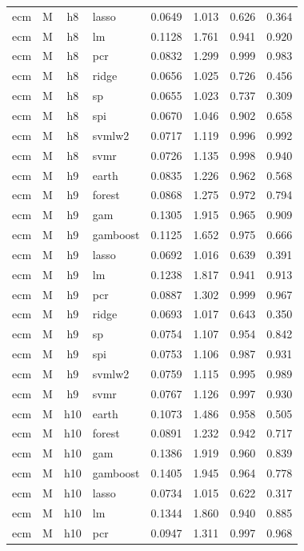 \begin{ThreePartTable}
\begin{longtable}[t]{llclcccc}
ecm & M & h8 & lasso & 0.0649 & 1.013 & 0.626 & 0.364\\
ecm & M & h8 & lm & 0.1128 & 1.761 & 0.941 & 0.920\\
ecm & M & h8 & pcr & 0.0832 & 1.299 & 0.999 & 0.983\\
ecm & M & h8 & ridge & 0.0656 & 1.025 & 0.726 & 0.456\\
ecm & M & h8 & sp & 0.0655 & 1.023 & 0.737 & 0.309\\
ecm & M & h8 & spi & 0.0670 & 1.046 & 0.902 & 0.658\\
ecm & M & h8 & svmlw2 & 0.0717 & 1.119 & 0.996 & 0.992\\
ecm & M & h8 & svmr & 0.0726 & 1.135 & 0.998 & 0.940\\
\addlinespace
ecm & M & h9 & earth & 0.0835 & 1.226 & 0.962 & 0.568\\
ecm & M & h9 & forest & 0.0868 & 1.275 & 0.972 & 0.794\\
ecm & M & h9 & gam & 0.1305 & 1.915 & 0.965 & 0.909\\
ecm & M & h9 & gamboost & 0.1125 & 1.652 & 0.975 & 0.666\\
ecm & M & h9 & lasso & 0.0692 & 1.016 & 0.639 & 0.391\\
ecm & M & h9 & lm & 0.1238 & 1.817 & 0.941 & 0.913\\
ecm & M & h9 & pcr & 0.0887 & 1.302 & 0.999 & 0.967\\
ecm & M & h9 & ridge & 0.0693 & 1.017 & 0.643 & 0.350\\
ecm & M & h9 & sp & 0.0754 & 1.107 & 0.954 & 0.842\\
ecm & M & h9 & spi & 0.0753 & 1.106 & 0.987 & 0.931\\
ecm & M & h9 & svmlw2 & 0.0759 & 1.115 & 0.995 & 0.989\\
ecm & M & h9 & svmr & 0.0767 & 1.126 & 0.997 & 0.930\\
\addlinespace
ecm & M & h10 & earth & 0.1073 & 1.486 & 0.958 & 0.505\\
ecm & M & h10 & forest & 0.0891 & 1.232 & 0.942 & 0.717\\
ecm & M & h10 & gam & 0.1386 & 1.919 & 0.960 & 0.839\\
ecm & M & h10 & gamboost & 0.1405 & 1.945 & 0.964 & 0.778\\
ecm & M & h10 & lasso & 0.0734 & 1.015 & 0.622 & 0.317\\
ecm & M & h10 & lm & 0.1344 & 1.860 & 0.940 & 0.885\\
ecm & M & h10 & pcr & 0.0947 & 1.311 & 0.997 & 0.968\\

\end{longtable}
\end{ThreePartTable}
